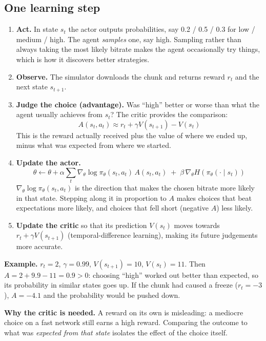 \subsection{One learning step}
\begin{enumerate}
  \item \textbf{Act.} In state $s_t$ the actor outputs probabilities, say 0.2 / 0.5 / 0.3 for low / medium / high. The agent \emph{samples} one, say high.
        Sampling rather than always taking the most likely bitrate makes the agent occasionally try things, which is how it discovers better strategies.
  \item \textbf{Observe.} The simulator downloads the chunk and returns reward $r_t$ and the next state $s_{t+1}$.
  \item \textbf{Judge the choice (advantage).} Was ``high'' better or worse than what the agent usually achieves from $s_t$? The critic provides the
        comparison:
        \[ A(s_t, a_t) \approx r_t + \gamma V(s_{t+1}) - V(s_t) \]
        This is the reward actually received plus the value of where we ended up, minus what was expected from where we started.
  \item \textbf{Update the actor.}
        \[ \theta \leftarrow \theta + \alpha \sum_t \nabla_\theta \log \pi_\theta(s_t, a_t)\, A(s_t, a_t) \;+\; \beta\, \nabla_\theta H(\pi_\theta(\cdot \mid s_t)) \]
        $\nabla_\theta \log \pi_\theta(s_t, a_t)$ is the direction that makes the chosen bitrate more likely in that state. Stepping along it in proportion
        to $A$ makes choices that beat expectations more likely, and choices that fell short (negative $A$) less likely.
  \item \textbf{Update the critic} so that its prediction $V(s_t)$ moves towards $r_t + \gamma V(s_{t+1})$ (temporal-difference learning), making its
        future judgements more accurate.
\end{enumerate}

\textbf{Example.} $r_t = 2$, $\gamma = 0.99$, $V(s_{t+1}) = 10$, $V(s_t) = 11$. Then $A = 2 + 9.9 - 11 = 0.9 > 0$: choosing ``high'' worked out better
than expected, so its probability in similar states goes up. If the chunk had caused a freeze ($r_t = -3$), $A = -4.1$ and the probability would be pushed down.

\textbf{Why the critic is needed.} A reward on its own is misleading: a mediocre choice on a fast network still earns a high reward. Comparing the
outcome to what was \emph{expected from that state} isolates the effect of the choice itself.

